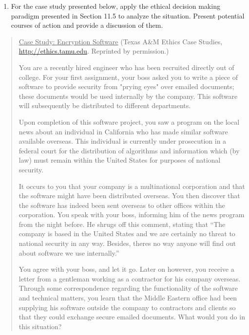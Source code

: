 \begin{enumerate}
\def\labelenumi{\arabic{enumi}.}
\setcounter{enumi}{9}
\item
  For the case study presented below, apply the ethical decision making
  paradigm presented in Section 11.5 to analyze the situation. Present
  potential courses of action and provide a discussion of them.
\end{enumerate}

\begin{quote}
\ul{Case Study: Encryption Software} (Texas A\&M Ethics Case Studies,
\url{http://ethics.tamu.edu}. Reprinted by permission.)

You are a recently hired engineer who has been recruited directly out of
college. For your first assignment, your boss asked you to write a piece
of software to provide security from "prying eyes" over e­mailed
documents; these documents would be used internally by the company. This
software will subsequently be distributed to different departments.

Upon completion of this software project, you saw a program on the local
news about an individual in California who has made similar software
available overseas. This individual is currently under prosecution in a
federal court for the distribution of algorithms and information which
(by law) must remain within the United States for purposes of national
security.

It occurs to you that your company is a multinational corporation and
that the software might have been distributed overseas. You then
discover that the software has indeed been sent overseas to other
offices within the corporation. You speak with your boss, informing him
of the news program from the night before. He shrugs off this comment,
stating that ``The company is based in the United States and we are
certainly no threat to national security in any way. Besides,
there\textquotesingle s no way anyone will find out about software we
use internally.''

You agree with your boss, and let it go. Later on however, you receive a
letter from a gentleman working as a contractor for his company
overseas. Through some correspondence regarding the functionality of the
software and technical matters, you learn that the Middle Eastern office
had been supplying his software outside the company to contractors and
clients so that they could exchange secure e­mailed documents. What would
you do in this situation?
\end{quote}

